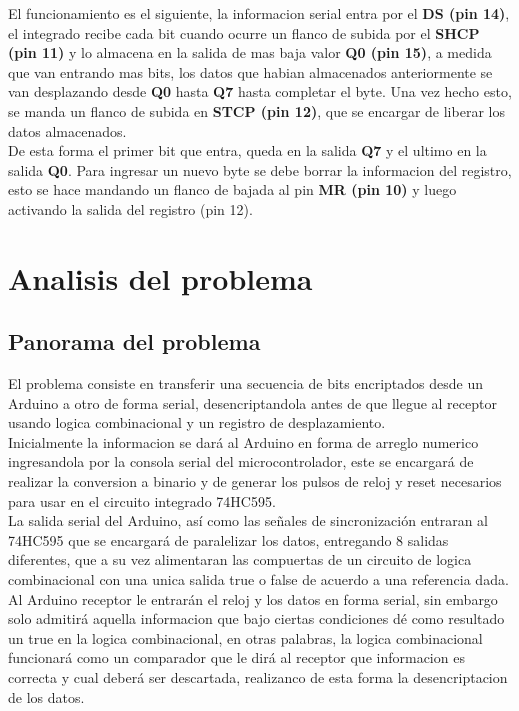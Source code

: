 \documentclass{article}
\begin{document}
El funcionamiento es el siguiente, la informacion serial entra por el \textbf{DS (pin 14)}, el integrado recibe cada bit cuando ocurre un flanco de subida por el \textbf{SHCP (pin 11)} y lo almacena en la salida de mas baja valor \textbf{Q0 (pin 15)}, a medida que van entrando mas bits, los datos que habian almacenados anteriormente se van desplazando desde \textbf{Q0} hasta \textbf{Q7} hasta completar el byte. Una vez hecho esto, se manda un flanco de subida en \textbf{STCP (pin 12)}, que se encargar de liberar los datos almacenados.\\

\noindent De esta forma el primer bit que entra, queda en la salida \textbf{Q7} y el ultimo en la salida \textbf{Q0}.
Para ingresar un nuevo byte se debe borrar la informacion del registro, esto se hace mandando un flanco de bajada al pin \textbf{MR (pin 10)} y luego activando la salida del registro (pin 12).\cite{74hc595datasheet}

\section{Analisis del problema} \label{analisis}

\subsection{Panorama del problema}


El problema consiste en transferir una secuencia de bits encriptados desde un Arduino a otro de forma serial, desencriptandola antes de que llegue al receptor usando logica combinacional y un registro de desplazamiento.\\

Inicialmente la informacion se dará al Arduino en forma de arreglo numerico ingresandola por la consola serial del microcontrolador, este se encargará de realizar la conversion a binario y de generar los pulsos de reloj y reset necesarios para usar en el circuito integrado 74HC595.\\

La salida serial del Arduino, así como las señales de sincronización entraran al 74HC595 que se encargará de paralelizar los datos, entregando 8 salidas diferentes, que a su vez alimentaran las compuertas de un circuito de logica combinacional con una unica salida true o false de acuerdo a una referencia dada.\\

Al Arduino receptor le entrarán el reloj y los datos en forma serial, sin embargo solo admitirá aquella informacion que bajo ciertas condiciones dé como resultado un true en la logica combinacional, en otras palabras, la logica combinacional funcionará como un comparador que le dirá al receptor que informacion es correcta y cual deberá ser descartada, realizanco de esta forma la desencriptacion de los datos.\\
\end{document}
